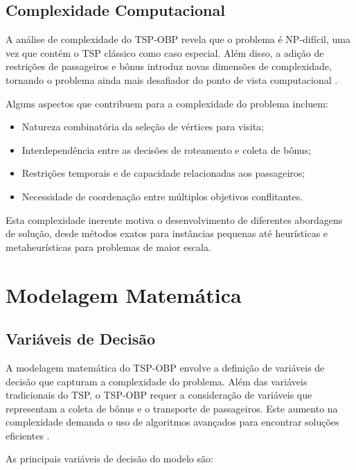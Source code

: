 \documentclass[12pt, a4paper]{report}
\begin{document}
\section{Complexidade Computacional}
A análise de complexidade do TSP-OBP revela que o problema é NP-difícil, uma vez que contém o TSP clássico como caso especial. Além disso, a adição de restrições de passageiros e bônus introduz novas dimensões de complexidade, tornando o problema ainda mais desafiador do ponto de vista computacional \cite{carvalho2022}.

Alguns aspectos que contribuem para a complexidade do problema incluem:

\begin{itemize}
    \item Natureza combinatória da seleção de vértices para visita;
    \item Interdependência entre as decisões de roteamento e coleta de bônus;
    \item Restrições temporais e de capacidade relacionadas aos passageiros;
    \item Necessidade de coordenação entre múltiplos objetivos conflitantes.
\end{itemize}

Esta complexidade inerente motiva o desenvolvimento de diferentes abordagens de solução, desde métodos exatos para instâncias pequenas até heurísticas e metaheurísticas para problemas de maior escala.

\chapter{Modelagem Matemática}

\section{Variáveis de Decisão}
A modelagem matemática do TSP-OBP envolve a definição de variáveis de decisão que capturam a complexidade do problema. Além das variáveis tradicionais do TSP, o TSP-OBP requer a consideração de variáveis que representam a coleta de bônus e o transporte de passageiros. Este aumento na complexidade demanda o uso de algoritmos avançados para encontrar soluções eficientes \cite{carvalho2022}.

As principais variáveis de decisão do modelo são:
\end{document}
